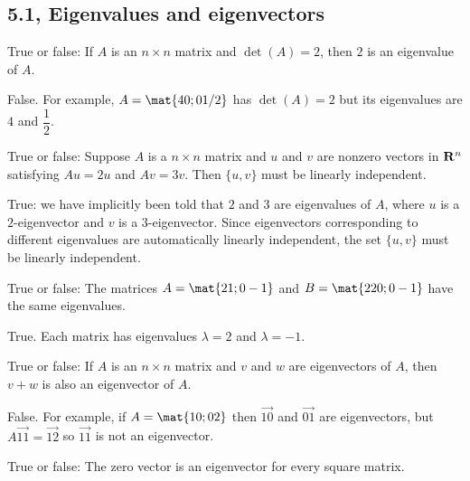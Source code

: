 




\subsection{5.1, Eigenvalues and eigenvectors}

\begin{problems}
%
\problem %
True or false: If $A$ is an $n \times n$ matrix and $\det(A)=2$, then $2$ is an
eigenvalue of $A$.

\begin{solution}
  False.  For example, $A=\mat{4 0; 0 1/2}$ has $\det(A)=2$ but its eigenvalues
  are $4$ and $\dfrac{1}{2}$.
\end{solution}

\problem %
True or false: Suppose $A$ is a $n \times n$ matrix and $u$ and $v$ are nonzero
vectors in ${\bf R}^{n}$ satisfying $Au = 2u$ and $Av = 3v$.  Then $\{u, v\}$ must
be linearly independent.

\begin{solution}
  True: we have implicitly been told that $2$ and $3$ are eigenvalues of $A$,
  where $u$ is a $2$-eigenvector and $v$ is a $3$-eigenvector.  Since eigenvectors
  corresponding to different eigenvalues are automatically linearly independent,
  the set $\{u,v\}$ must be linearly independent.
\end{solution}

\problem %
True or false: The matrices $A=\mat{2 1; 0 -1}$ and $B=\mat{2 20; 0 -1}$ have
the same eigenvalues.
    
\begin{solution}
  True.  Each matrix has eigenvalues $\lambda=2$ and $\lambda = -1$.
\end{solution}


\problem %
True or false: If $A$ is an $n \times n$ matrix and $v$ and $w$ are eigenvectors
of $A$, then $v+w$ is also an eigenvector of $A$.
    
\begin{solution}
  False.  For example, if $A= \mat{1 0; 0 2}$ then $\vec{1 0}$ and $\vec{0 1}$
  are eigenvectors, but $A \vec{1 1} = \vec{1 2}$ so $\vec{1 1}$ is not an
  eigenvector.
\end{solution}

\problem %
True or false: The zero vector is an eigenvector for every square matrix.
    

\end{problems}
